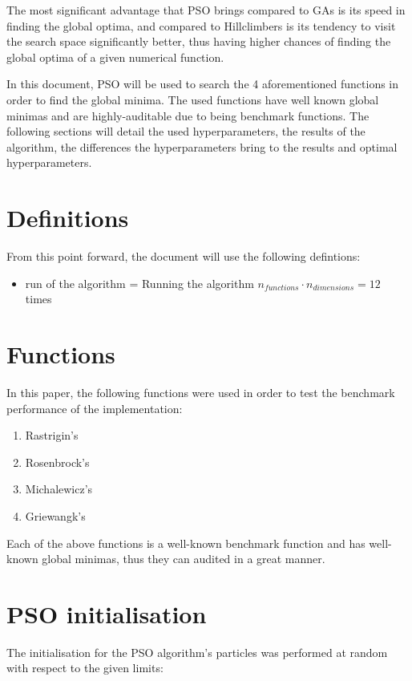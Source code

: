 \documentclass[conference]{IEEEtran}
\begin{document}
The most significant advantage that PSO brings compared to GAs is its speed in finding the global optima, and compared to Hillclimbers
is its tendency to visit the search space significantly better, thus having higher chances of finding the global optima of a
given numerical function.

In this document, PSO will be used to search the 4 aforementioned functions in order to find the global minima. The used functions
have well known global minimas and are highly-auditable due to being benchmark functions. The following sections will
detail the used hyperparameters, the results of the algorithm, the differences the hyperparameters bring to the results and
optimal hyperparameters.

\section{Definitions}
From this point forward, the document will use the following defintions:

\begin{itemize}
    \item run of the algorithm = Running the algorithm $n_{functions} \cdot n_{dimensions} = 12$ times
\end{itemize}

\section{Functions}
In this paper, the following functions were used in order to test the benchmark performance of the implementation:

\begin{enumerate}
    \item Rastrigin's
    \item Rosenbrock's
    \item Michalewicz's
    \item Griewangk's
\end{enumerate}

Each of the above functions is a well-known benchmark function and has well-known global minimas, thus they can audited
in a great manner.

\section{PSO initialisation}
The initialisation for the PSO algorithm's particles was performed at random with respect to the given limits:
\end{document}
